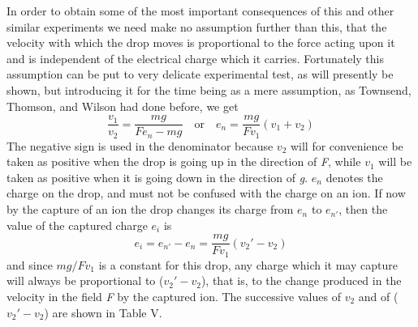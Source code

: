 In order to obtain some of the most important consequences of this and
other similar experiments we need make no assumption further than this,
that the velocity with which the drop moves is proportional to the force
acting upon it and is independent of the electrical charge which it
carries. Fortunately this assumption can be put to very delicate
experimental test, as will presently be shown, but introducing it for
the time being as a mere assumption, as Townsend, Thomson, and Wilson
had done before, we get
%
\begin{equation*}\tag{9}
\frac{v_1}{v_2} = \frac{mg}{Fe_n-mg} \quad\text{or}\quad e_n = \frac{mg}{Fv_1}(v_1+v_2) \label{eq:millikan_9}
\end{equation*}
%
The negative sign is used in the denominator because $v_2$ will for
convenience be taken as positive when the drop is going up in the
direction of \emph{F}, while $v_1$ will be taken as positive when it
is going down in the direction of \emph{g}. $e_n$ denotes the charge
on the drop, and must not be confused with the charge on an ion. If now
by the capture of an ion the drop changes its charge from $e_n$ to
$e_{n'}$, then the value of the captured charge $e_i$ is
\begin{equation*}\tag{10}
e_i = e_{n'}-e_n=\frac{mg}{Fv_1}(v_{2}'-v_2) \label{eq:millikan_10}
\end{equation*}
and since $mg/Fv_1$ is a constant for this drop, any charge which it
may capture will always be proportional to ($v_{2}'-v_2$),
that is, to the change produced in the velocity in the field \emph{F} by
the captured ion. The successive values of $v_2$ and of ($v_{2}'-v_2$) 
are shown in Table V.


